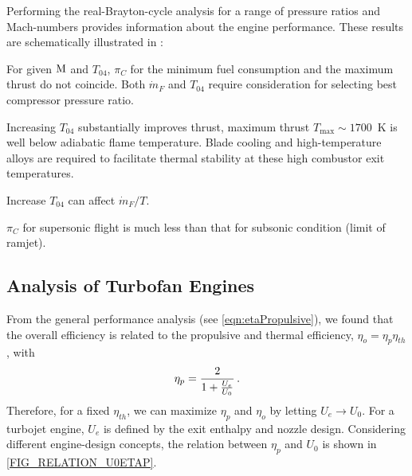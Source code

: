
Performing the real-Brayton-cycle analysis for a range of pressure ratios and Mach-numbers provides information about the engine performance. These results are schematically illustrated in :
\begin{itemizePacked}
\item For given ${\rm{M}}$ and $T_{04}$, $\pi_C$ for the minimum fuel consumption and the maximum thrust do not coincide. Both $\dot{m}_F$ and $T_{04}$ require consideration for selecting best compressor pressure ratio.
\item Increasing $T_{04}$ substantially improves thrust, maximum thrust $T_\text{max} \sim 1700$~K is well below adiabatic flame temperature. Blade cooling and high-temperature alloys are required to facilitate thermal stability at these high combustor exit temperatures.
\item Increase $T_{04}$ can affect $\dot{m}_F/T$.
\item $\pi_C$ for supersonic flight is much less than that for subsonic condition (limit of ramjet).
\end{itemizePacked}

\subsection{Analysis of Turbofan Engines}
From the general performance analysis (see \cref{eqn:etaPropulsive}), we found that the overall efficiency is related to the propulsive and thermal efficiency, $\eta_o = \eta_p \eta_{th}$, with
\[
\eta_p = {\frac{2}{1+{\frac{U_e}{U_0}}}}\,.
\]
Therefore, for a fixed $\eta_{th}$, we can maximize $\eta_p$ and $\eta_o$ by letting $U_e \rightarrow U_0$. For a turbojet engine, $U_e$ is defined by the exit enthalpy and nozzle design. Considering different engine-design concepts, the relation between $\eta_p$ and $U_0$ is shown in \cref{FIG_RELATION_U0ETAP}.

